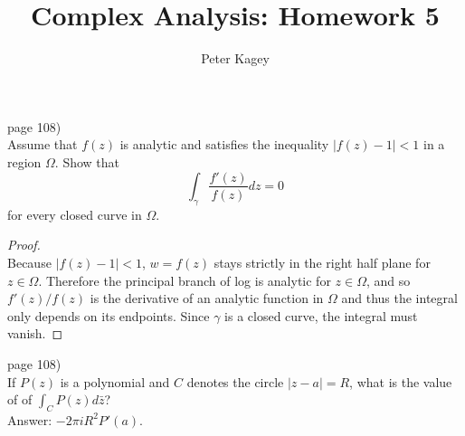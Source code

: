 \documentclass{article}
\newenvironment{problem}[2][Problem]{\begin{trivlist}
\item[\hskip \labelsep {\bfseries #1}\hskip \labelsep {\bfseries #2.}]}{\end{trivlist}}
\begin{document}
\title{Complex Analysis: Homework 5}
\author{Peter Kagey}

\maketitle

\begin{problem}{6} (page 108) \\
  Assume that $f(z)$ is analytic and satisfies the inequality $|f(z)-1| < 1$ in
  a region $\Omega$. Show that \[
    \int_\gamma \frac{f'(z)}{f(z)}dz = 0
  \] for every closed curve in $\Omega$.
\end{problem}

\begin{proof} \text{} \\
  Because $|f(z) - 1| < 1$, $w = f(z)$ stays strictly in the right half plane
  for $z \in \Omega$.
  Therefore the principal branch of log is analytic for $z \in \Omega$, and so
  $f'(z)/f(z)$ is the derivative of an analytic function in $\Omega$ and thus
  the integral only depends on its endpoints. Since $\gamma$ is a closed curve,
  the integral must vanish.
\end{proof}
\pagebreak

\begin{problem}{7} (page 108) \\
  If $P(z)$ is a polynomial and $C$ denotes the circle $|z-a| = R$,
  what is the value of of $\displaystyle \int_C P(z) d\bar{z}$?\\
  Answer: $-2\pi iR^2P'(a)$.
\end{problem}
\end{document}
